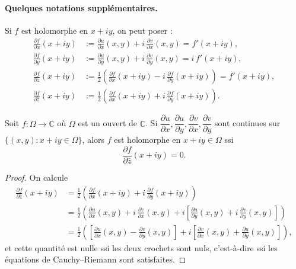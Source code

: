 \paragraph{Quelques notations supplémentaires.}
Si $f$ est holomorphe en $x+iy$, on peut poser :
\begin{align*}
\frac{\partial f}{\partial x}(x+iy) &:= \frac{\partial u}{\partial x}(x,y) + i\,\frac{\partial v}{\partial x}(x,y) = f'(x+iy), \\[4pt]
\frac{\partial f}{\partial y}(x+iy) &:= \frac{\partial u}{\partial y}(x,y) + i\,\frac{\partial v}{\partial y}(x,y) = i\,f'(x+iy), \\[4pt]
\frac{\partial f}{\partial z}(x+iy) &:= \frac12 \left( \frac{\partial f}{\partial x}(x+iy) - i\,\frac{\partial f}{\partial y}(x+iy) \right) = f'(x+iy), \\[4pt]
\frac{\partial f}{\partial \bar z}(x+iy) &:= \frac12 \left( \frac{\partial f}{\partial x}(x+iy) + i\,\frac{\partial f}{\partial y}(x+iy) \right).
\end{align*}

\begin{proposition}
Soit $f : \Omega \to \mathbb{C}$ où $\Omega$ est un ouvert de $\mathbb{C}$.
Si $\dfrac{\partial u}{\partial x}, \dfrac{\partial u}{\partial y}, \dfrac{\partial v}{\partial x}, \dfrac{\partial v}{\partial y}$
sont continues sur $\{(x,y) : x+iy \in \Omega\}$, alors $f$ est holomorphe en $x+iy \in \Omega$ ssi
\[
\frac{\partial f}{\partial \bar z}(x+iy) = 0 .
\]
\end{proposition}

\begin{proof}
On calcule
\begin{align*}
\frac{\partial f}{\partial \bar z}(x+iy)
&= \frac12 \left( \frac{\partial f}{\partial x}(x+iy) + i\,\frac{\partial f}{\partial y}(x+iy) \right) \\
&= \frac12 \left( \frac{\partial u}{\partial x}(x,y) + i\,\frac{\partial v}{\partial x}(x,y)
   + i \left[ \frac{\partial u}{\partial y}(x,y) + i\,\frac{\partial v}{\partial y}(x,y) \right] \right) \\
&= \frac12 \left( \left[ \frac{\partial u}{\partial x}(x,y) - \frac{\partial v}{\partial y}(x,y) \right]
   + i \left[ \frac{\partial v}{\partial x}(x,y) + \frac{\partial u}{\partial y}(x,y) \right] \right),
\end{align*}
et cette quantité est nulle ssi les deux crochets sont nuls, c'est-à-dire ssi les équations de Cauchy--Riemann sont satisfaites.
\end{proof}


